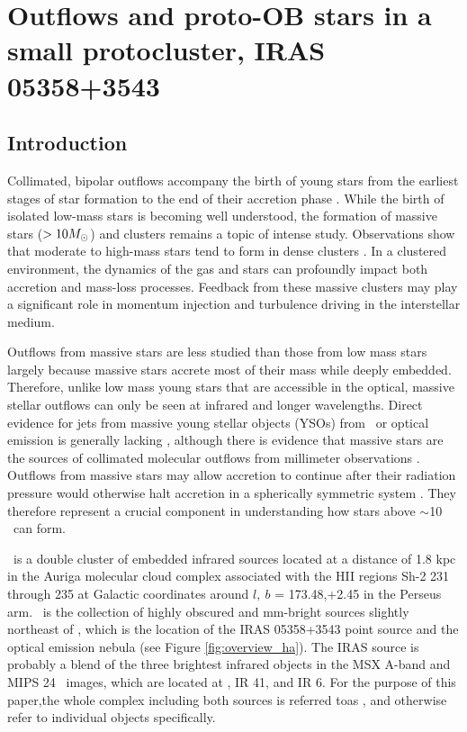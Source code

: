 
\chapter{Outflows and proto-OB stars in a small protocluster, IRAS 05358+3543}

\section{Introduction}
Collimated, bipolar outflows accompany the birth of young stars from the
earliest stages of star formation to the end of their accretion phase
\citep[e.g.][]{reipurth2001}.    While the birth of isolated low-mass stars is
becoming well understood, the formation of massive stars ($>10 M_{\odot}$) and clusters remains a
topic of intense study.    Observations show that moderate to high-mass stars
tend to form in dense clusters \citep{lada2003}.    In a clustered environment,  the dynamics of
the gas and stars can profoundly impact both accretion and mass-loss processes.
Feedback from these massive clusters may play a significant role in momentum
injection and turbulence driving in the interstellar medium.  

Outflows from massive stars are less studied than those from low mass stars
largely because massive stars accrete most of their mass while deeply embedded.
Therefore, unlike low mass young stars that are accessible in the optical,
massive stellar outflows can only be seen at infrared and longer wavelengths.
Direct evidence for jets from massive young stellar objects (YSOs) from \hh\ or
optical emission is generally lacking
\citep[e.g.][]{alvarez2005,kumar2002,wang2003}, although there is evidence that
massive stars are the sources of collimated molecular outflows from millimeter
observations \citep[e.g.][]{beuther2002b}.  Outflows from massive stars may
allow accretion to continue after their radiation pressure would
otherwise halt accretion in a spherically symmetric system
\citep{krumholz2009}.  They therefore represent a crucial component in
understanding how stars above $\sim$10 \msun\ can form.

\region\ is a double cluster of embedded infrared sources located at a distance
of 1.8 kpc in the Auriga molecular cloud complex \citep{heyer1996} associated
with the HII regions Sh-2 231 through 235 at Galactic coordinates around $l,~b$
= 173.48,+2.45 in the Perseus arm.   \necluster\ is the
collection of highly obscured and mm-bright sources slightly northeast of
\swcluster, which is the location of the IRAS 05358+3543 point source and the
optical emission nebula (see Figure \ref{fig:overview_ha}).  The IRAS source is
probably a blend of the three brightest infrared objects in the MSX A-band and
MIPS 24 \um\ images, which are located at \necluster, IR 41, and IR 6. For the
purpose of this paper,the whole complex including both sources is referred toas
\region, and otherwise refer to individual objects specifically.

